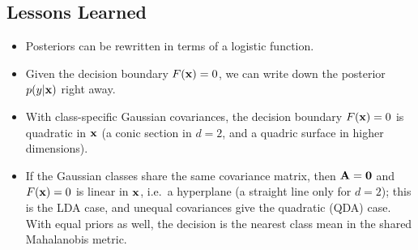    \subsection{Lessons Learned}

  \begin{itemize}
    \item Posteriors can be rewritten in terms of a logistic function. 
    \item Given the decision boundary $F(\bm{\mathrm{x}})=0$, we can write down the posterior $p(y|\bm{\mathrm{x}})$ right away.
    \item With class-specific Gaussian covariances, the decision boundary $F(\bm{\mathrm{x}})=0$ is quadratic in $\bm{\mathrm{x}}$ (a conic section in $d=2$, and a quadric surface in higher dimensions).
    \item If the Gaussian classes share the same covariance matrix, then $\mathbf{A}=\mathbf{0}$ and $F(\bm{\mathrm{x}})=0$ is linear in $\bm{\mathrm{x}}$, i.e.\ a hyperplane (a straight line only for $d=2$); this is the LDA case, and unequal covariances give the quadratic (QDA) case. With equal priors as well, the decision is the nearest class mean in the shared Mahalanobis metric.


\end{itemize}
